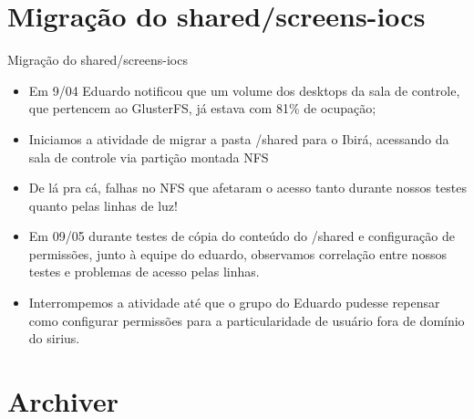 \documentclass[aspectratio=169]{beamer}            %
\begin{document}
\section{Migração do shared/screens-iocs}

\begin{frame}{Migração do shared/screens-iocs}

{\footnotesize 
\begin{itemize}
    \setlength\itemsep{1em}
    \item Em 9/04 Eduardo notificou que um volume dos desktops da sala de controle, que pertencem ao GlusterFS, já estava com 81\% de ocupação;
    \item Iniciamos a atividade de migrar a pasta /shared para o Ibirá, acessando da sala de controle via partição montada NFS
    \item De lá pra cá, falhas no NFS que afetaram o acesso tanto durante nossos testes quanto pelas linhas de luz!
    \item Em 09/05 durante testes de cópia do conteúdo do /shared e configuração de permissões, junto à equipe do eduardo, observamos correlação entre nossos testes e problemas de acesso pelas linhas.
    \item Interrompemos a atividade até que o grupo do Eduardo pudesse repensar como configurar permissões para a particularidade de usuário fora de domínio do sirius.
\end{itemize}
}

\end{frame}



\section{Archiver}
\end{document}
